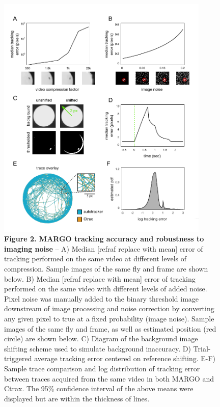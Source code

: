 \documentclass[10pt]{article}
\begin{document}
\newpage
\begin{figure}[h!]
	\begin{center}
		\includegraphics[width=0.9\textwidth]{../figures/autotracker_performance.pdf}
	\end{center}
	\caption*{\footnotesize \textbf{Figure 2. MARGO tracking accuracy and robustness to imaging noise} -- A) Median [refraf replace with mean] error of tracking performed on the same video at different levels of compression. Sample images of the same fly and frame are shown below. B) Median [refraf replace with mean] error of tracking performed on the same video with different levels of added noise. Pixel noise was manually added to the binary threshold image downstream of image processing and noise correction by converting any given pixel to true at a fixed probability (image noise). Sample images of the same fly and frame, as well as estimated position (red circle) are shown below. C) Diagram of the background image shifting scheme used to simulate background inaccuracy. D) Trial-triggered average tracking error centered on reference shifting. E-F) Sample trace comparison and log distribution of tracking error between traces acquired from the same video in both MARGO and Ctrax. The 95\% confidence interval of the above means were displayed but are within the thickness of lines.}
\end{figure}
\end{document}
